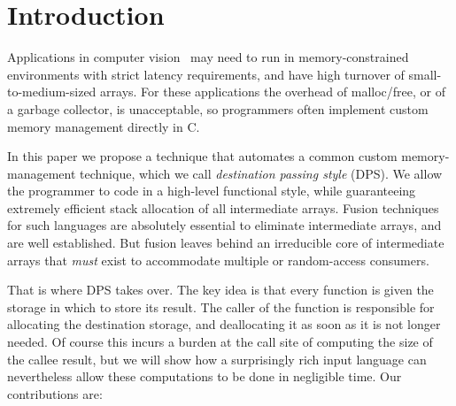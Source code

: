 \section{Introduction}

Applications in computer vision~\cite{triggs1999bundle,taylor2014user} may need to run in memory-constrained environments with strict latency requirements, and have high turnover of small-to-medium-sized arrays.
For these applications the overhead of malloc/free, or of a garbage collector, is unacceptable,
so programmers often implement custom memory management directly in C. %

In this paper we propose a technique that automates a common custom memory-management
technique, which we call \emph{destination passing style} (DPS).
We allow the programmer to code in a high-level functional style, while guaranteeing
extremely efficient stack allocation of all intermediate arrays.
Fusion techniques for such languages are absolutely essential to eliminate
intermediate arrays, and are well established.  But fusion leaves behind an
irreducible core of intermediate arrays that \emph{must} exist to accommodate
multiple or random-access consumers.  

That is where DPS takes over.  The key idea is that every function is given the storage in which to store its result.  The caller of the function is responsible for allocating the destination storage, and deallocating it as soon as it is not longer needed.  
Of course this incurs a burden at the call site of computing the size of the callee result, but we will show how a surprisingly rich input language can nevertheless allow these computations to be done in negligible time.  Our contributions are:




